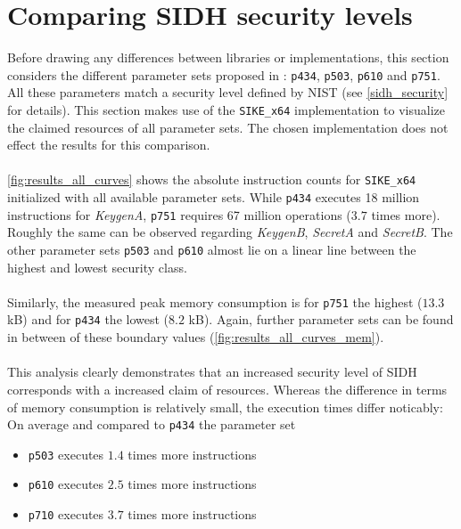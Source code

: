 \section{Comparing \gls{SIDH} security levels}\label{sec:analysis_sidh_levels}

Before drawing any differences between libraries or implementations, this section considers the different parameter sets proposed in \parencite{sike2020spec}: \texttt{p434}, \texttt{p503}, \texttt{p610} and \texttt{p751}. All these parameters match a security level defined by \gls{NIST} (see \autoref{sidh_security} for details). This section makes use of the \texttt{SIKE\_x64} implementation to visualize the claimed resources of all parameter sets. The chosen implementation does not effect the results for this comparison.\\\\
\autoref{fig:results_all_curves} shows the absolute instruction counts for \texttt{SIKE\_x64} initialized with all available parameter sets. While \texttt{p434} executes 18 million instructions for \textit{KeygenA}, \texttt{p751} requires 67 million operations ($3.7$ times more). Roughly the same can be observed regarding \textit{KeygenB}, \textit{SecretA} and \textit{SecretB}. The other parameter sets \texttt{p503} and \texttt{p610} almost lie on a linear line between the highest and lowest security class.\\\\
Similarly, the measured peak memory consumption is for \texttt{p751} the highest ($13.3$ \gls{kB}) and for \texttt{p434} the lowest ($8.2$ \gls{kB}). Again, further parameter sets can be found in between of these boundary values (\autoref{fig:results_all_curves_mem}). \\\\
This analysis clearly demonstrates that an increased security level of \gls{SIDH} corresponds with a increased claim of resources. Whereas the difference in terms of memory consumption is relatively small, the execution times differ noticably: On average and compared to \texttt{p434} the parameter set
\begin{itemize}
\itemsep0em 
\item \texttt{p503} executes $1.4$ times more instructions
\item \texttt{p610} executes $2.5$ times more instructions
\item \texttt{p710} executes $3.7$ times more instructions
\end{itemize}

